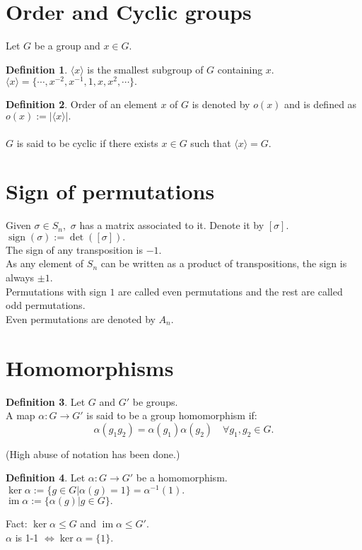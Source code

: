 \documentclass[12 pt, a4paper, toc=graduated, oneside]{article}
\theoremstyle{definition}
\newtheorem{defn}{Definition}
\newcommand{\im}{\operatorname{im}}
\begin{document}
\section{Order and Cyclic groups}
Let $G$ be a group and $x \in G.$\\
\begin{defn}
	$\langle x\rangle$ is the smallest subgroup of $G$ containing $x.$\\
	$\langle x\rangle = \{\cdots, x^{-2}, x^{-1}, 1, x, x^2, \cdots\}.$\\
\end{defn}
\begin{defn}
	Order of an element $x$ of $G$ is denoted by $o(x)$ and is defined as $o(x) := |\langle x\rangle|.$\\~\\
	$G$ is said to be cyclic if there exists $x \in G$ such that $\langle x\rangle = G.$
\end{defn}

\section{Sign of permutations}
Given $\sigma \in S_n,$ $\sigma$ has a matrix associated to it. Denote it by $[\sigma].$\\
$\operatorname{sign}(\sigma) := \det([\sigma]).$\\
The sign of any transposition is $-1.$\\
As any element of $S_n$ can be written as a product of transpositions, the sign is always $\pm 1.$\\
Permutations with sign $1$ are called even permutations and the rest are called odd permutations.\\
Even permutations are denoted by $A_n.$

\section{Homomorphisms}
\begin{defn}
	Let $G$ and $G'$ be groups.\\
	A map $\alpha:G\to G'$ is said to be a group homomorphism if:
	\[\alpha(g_1g_2) = \alpha(g_1)\alpha(g_2) \quad \forall g_1, g_2 \in G.\]
\end{defn}
(High abuse of notation has been done.)

\begin{defn}
	Let $\alpha : G \to G'$ be a homomorphism.\\
	$\ker \alpha := \{g \in G | \alpha(g) = 1\} = \alpha^{-1}(1).$\\
	$\im \alpha := \{\alpha(g) | g \in G\}.$
\end{defn}
Fact: $\ker \alpha \le G$ and $\im \alpha \le G'.$\\
$\alpha$ is 1-1 $\iff \ker \alpha = \{1\}.$ 
\end{document}
